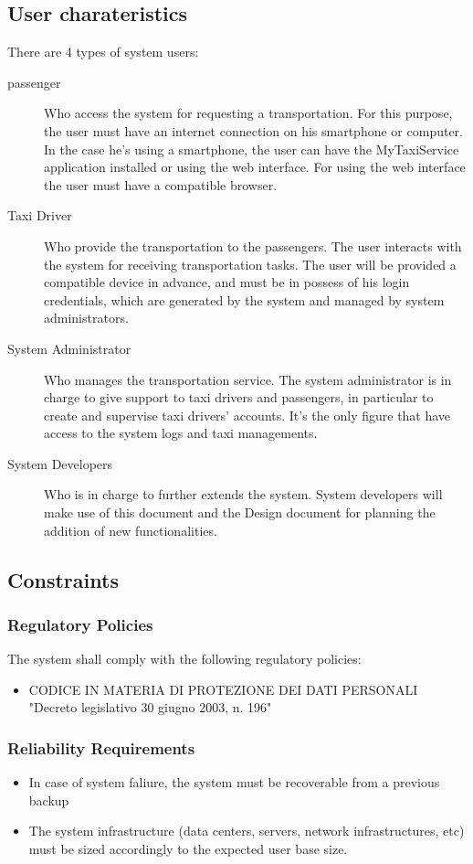 \documentclass[11pt, a4paper,titlepage]{article}
\newcommand{\productname}{MyTaxiService }
\begin{document}
\subsection{User charateristics}
	There are 4 types of system users: \newline
	\begin{description}
		\item[passenger] Who access the system for requesting a transportation. For this purpose, the user must have an internet connection on his smartphone or computer. In the case he's using a smartphone, the user can have the \productname application installed or using the web interface. For using the web interface the user must have a compatible browser.
		\item[Taxi Driver] Who provide the transportation to the passengers. The user interacts with the system for receiving transportation tasks. The user will be provided a compatible device in advance, and must be in possess of his login credentials, which are generated by the system and managed by system administrators. 
		\item[System Administrator] Who manages the transportation service. The system administrator is in charge to give support to taxi drivers and passengers, in particular to create and supervise taxi drivers' accounts. It's the only figure that have access to the system logs and taxi managements.
		\item[System Developers] Who is in charge to further extends the system. System developers will make use of this document and the Design document for planning the addition of new functionalities.
	\end{description}
\subsection{Constraints}
\subsubsection{Regulatory Policies}
The system shall comply with the following regulatory policies:
\begin{itemize}
	\item CODICE IN MATERIA DI PROTEZIONE DEI DATI PERSONALI "Decreto legislativo 30 giugno 2003, n. 196"
\end{itemize}
\subsubsection{Reliability Requirements}
	\begin{itemize}
		\item In case of system faliure, the system must be recoverable from a previous backup
		
		\item The system infrastructure (data centers, servers, network infrastructures, etc) must be sized accordingly to the expected user base size. 
		
	\end{itemize}
\end{document}

